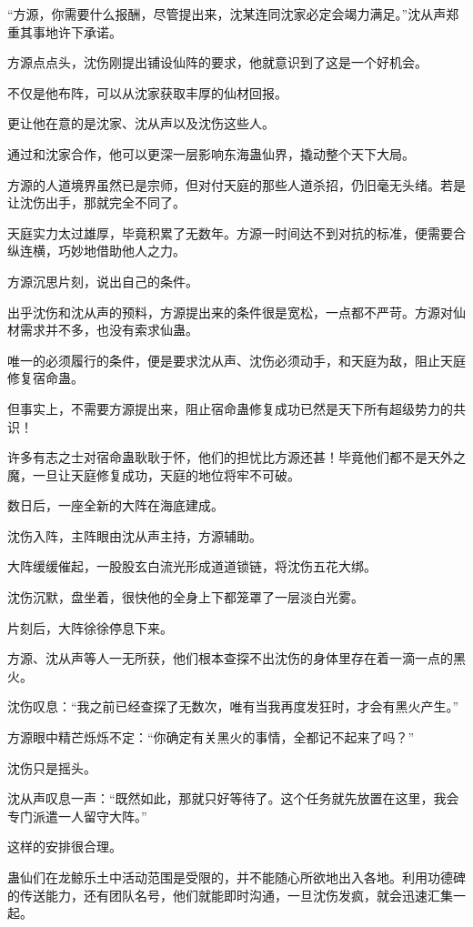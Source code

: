 \begin{this_body}
“方源，你需要什么报酬，尽管提出来，沈某连同沈家必定会竭力满足。”沈从声郑重其事地许下承诺。

方源点点头，沈伤刚提出铺设仙阵的要求，他就意识到了这是一个好机会。

不仅是他布阵，可以从沈家获取丰厚的仙材回报。

更让他在意的是沈家、沈从声以及沈伤这些人。

通过和沈家合作，他可以更深一层影响东海蛊仙界，撬动整个天下大局。

方源的人道境界虽然已是宗师，但对付天庭的那些人道杀招，仍旧毫无头绪。若是让沈伤出手，那就完全不同了。

天庭实力太过雄厚，毕竟积累了无数年。方源一时间达不到对抗的标准，便需要合纵连横，巧妙地借助他人之力。

方源沉思片刻，说出自己的条件。

出乎沈伤和沈从声的预料，方源提出来的条件很是宽松，一点都不严苛。方源对仙材需求并不多，也没有索求仙蛊。

唯一的必须履行的条件，便是要求沈从声、沈伤必须动手，和天庭为敌，阻止天庭修复宿命蛊。

但事实上，不需要方源提出来，阻止宿命蛊修复成功已然是天下所有超级势力的共识！

许多有志之士对宿命蛊耿耿于怀，他们的担忧比方源还甚！毕竟他们都不是天外之魔，一旦让天庭修复成功，天庭的地位将牢不可破。

数日后，一座全新的大阵在海底建成。

沈伤入阵，主阵眼由沈从声主持，方源辅助。

大阵缓缓催起，一股股玄白流光形成道道锁链，将沈伤五花大绑。

沈伤沉默，盘坐着，很快他的全身上下都笼罩了一层淡白光雾。

片刻后，大阵徐徐停息下来。

方源、沈从声等人一无所获，他们根本查探不出沈伤的身体里存在着一滴一点的黑火。

沈伤叹息：“我之前已经查探了无数次，唯有当我再度发狂时，才会有黑火产生。”

方源眼中精芒烁烁不定：“你确定有关黑火的事情，全都记不起来了吗？”

沈伤只是摇头。

沈从声叹息一声：“既然如此，那就只好等待了。这个任务就先放置在这里，我会专门派遣一人留守大阵。”

这样的安排很合理。

蛊仙们在龙鲸乐土中活动范围是受限的，并不能随心所欲地出入各地。利用功德碑的传送能力，还有团队名号，他们就能即时沟通，一旦沈伤发疯，就会迅速汇集一起。


\end{this_body}
